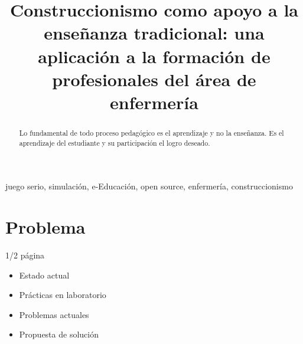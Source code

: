 \documentclass[conference]{IEEEtran}
\begin{document}
\title{Construccionismo como apoyo a la enseñanza tradicional:  una
	aplicación a la formación de profesionales del área de enfermería}

\author{
\and
{}
}

\maketitle
\thispagestyle{plain}


\begin{abstract}
Lo fundamental de todo proceso pedagógico es el aprendizaje y no la enseñanza.
Es el aprendizaje del estudiante y su participación el logro deseado.

\end{abstract}

\begin{IEEEkeywords}
    juego serio, simulación, e-Educación, open source, enfermería,
    construccionismo
\end{IEEEkeywords}








\section{Problema}
1/2 página
\begin{itemize}
\item Estado actual
\item Prácticas en laboratorio
\item Problemas actuales
\item Propuesta de solución
\end{itemize}
\end{document}
